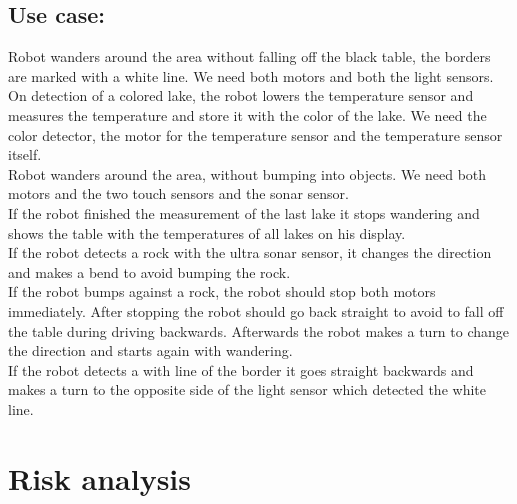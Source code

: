\documentclass[10pt,a4paper]{article}
\begin{document}
\subsection*{Use case:}

Robot wanders around the area without falling off the black table, the borders are marked with a white line.
We need both motors and both the light sensors.\\

On detection of a colored lake, the robot lowers the temperature sensor and measures the temperature and store it with the color of the lake.
We need the color detector, the motor for the temperature sensor and the temperature sensor itself.\\

Robot wanders around the area, without bumping into objects.
We need both motors and the two touch sensors and the sonar sensor.\\ %

If the robot finished the measurement of the last lake it stops wandering and shows the table with the temperatures of all lakes on his display. \\

If the robot detects a rock with the ultra sonar sensor, it changes the direction and makes a bend to avoid bumping the rock.\\

If the robot bumps against a rock, the robot should stop both motors immediately. After stopping the robot should go back straight to avoid to fall off the table during driving backwards. Afterwards the robot makes a turn to change the direction and starts again with wandering.\\

If the robot detects a with line of the border it goes straight backwards and makes a turn to the opposite side of the light sensor which detected the white line. \\


\section*{Risk analysis}
\end{document}

